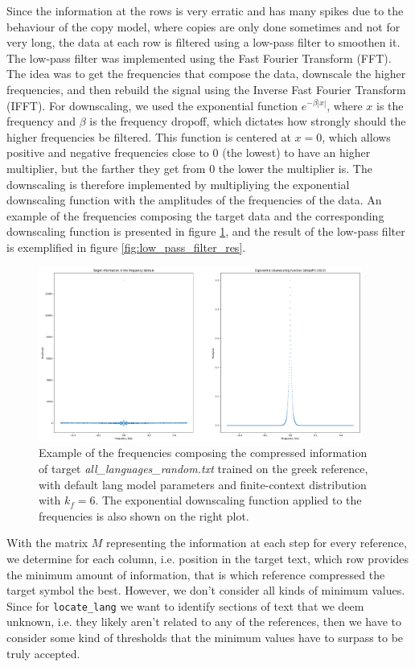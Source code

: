 \documentclass{article}
\begin{document}
Since the information at the rows is very erratic and has many spikes due to the behaviour of the copy model, where copies are only done sometimes and not for very long, the data at each row is filtered using a low-pass filter to smoothen it.
The low-pass filter was implemented using the Fast Fourier Transform (FFT).
The idea was to get the frequencies that compose the data, downscale the higher frequencies, and then rebuild the signal using the Inverse Fast Fourier Transform (IFFT).
For downscaling, we used the exponential function $e^{-\beta|x|}$, where $x$ is the frequency and $\beta$ is the frequency dropoff, which dictates how strongly should the higher frequencies be filtered.
This function is centered at $x=0$, which allows positive and negative frequencies close to 0 (the lowest) to have an higher multiplier, but the farther they get from 0 the lower the multiplier is.
The downscaling is therefore implemented by multipliying the exponential downscaling function with the amplitudes of the frequencies of the data.
An example of the frequencies composing the target data and the corresponding downscaling function is presented in figure \ref{fig:low_pass_filter}, and the result of the low-pass filter is exemplified in figure \ref{fig:low_pass_filter_res}.

\begin{figure}
    \centering
    \includegraphics[width=0.95\textwidth]{./images/low_pass_filter.png}
    \caption{Example of the frequencies composing the compressed information of target \textit{all\_languages\_random.txt} trained on the greek reference, with default lang model parameters and finite-context distribution with $k_f=6$. The exponential downscaling function applied to the frequencies is also shown on the right plot.}
    \label{fig:low_pass_filter}
\end{figure}

With the matrix $M$ representing the information at each step for every reference, we determine for each column, i.e. position in the target text, which row provides the minimum amount of information, that is which reference compressed the target symbol the best.
However, we don't consider all kinds of minimum values.
Since for \texttt{locate_lang} we want to identify sections of text that we deem unknown, i.e. they likely aren't related to any of the references, then we have to consider some kind of thresholds that the minimum values have to surpass to be truly accepted.
\end{document}
